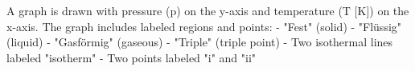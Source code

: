 A graph is drawn with pressure (p) on the y-axis and temperature (T [K]) on the x-axis. The graph includes labeled regions and points:  
- "Fest" (solid)  
- "Flüssig" (liquid)  
- "Gasförmig" (gaseous)  
- "Triple" (triple point)  
- Two isothermal lines labeled "isotherm"  
- Two points labeled "i" and "ii"